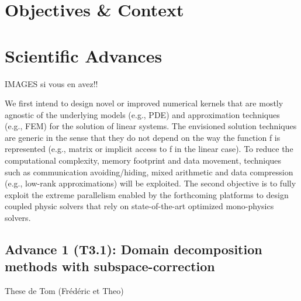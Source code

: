 
\section{Objectives \& Context}

\section{Scientific Advances}

IMAGES si vous en avez!! 

We first intend to design novel or improved numerical kernels that are mostly agnostic of the
underlying models (e.g., PDE) and approximation techniques (e.g., FEM) for the solution of linear
systems. The envisioned solution techniques are generic in the sense that they do not depend on the
way the function f is represented (e.g., matrix or implicit access to f in the linear case). To reduce the
computational complexity, memory footprint and data movement, techniques such as communication
avoiding/hiding, mixed arithmetic and data compression (e.g., low-rank approximations) will be
exploited. The second objective is to fully exploit the extreme parallelism enabled by the forthcoming
platforms to design coupled physic solvers that rely on state-of-the-art optimized mono-physics
solvers.

 \subsection{ 
 Advance 1 (T3.1): Domain decomposition methods with subspace-correction 
 }
 These de Tom (Frédéric et Theo) \\

